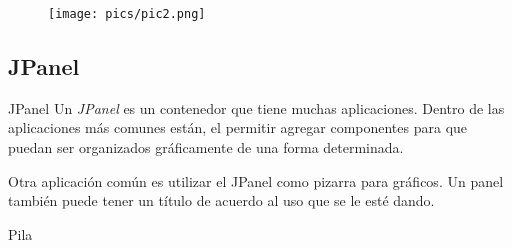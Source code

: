 \documentclass[11pt]{beamer}
\begin{document}
\begin{frame}

\begin{center}
\begin{figure}
\texttt{[image: pics/pic2.png]} 
\end{figure}
\end{center}
\end{frame}
\subsection{JPanel}
\begin{frame}{JPanel}
Un \textit{JPanel} es un contenedor que tiene muchas aplicaciones. Dentro de las aplicaciones más comunes están, el permitir agregar componentes para que puedan ser organizados gráficamente de una forma determinada.
\end{frame}

\begin{frame}
Otra aplicación común es utilizar el JPanel como pizarra para gráficos. Un panel también puede tener un título de acuerdo al uso que se le esté dando.
\end{frame}

\begin{frame}{Pila}
\begin{center}
\end{center}

\end{frame}
\end{document}
